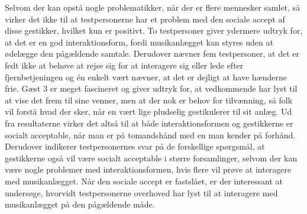 Selvom der kan opstå nogle problematikker, når der er flere mennesker samlet, så virker det ikke til at testpersonerne har et problem med den sociale accept af disse gestikker, hvilket kun er positivt. To testpersoner giver ydermere udtryk for, at det er en god interaktionsform, fordi musikanlægget kan styres uden at ødelægge den pågældende samtale. Derudover nævner fem testpersoner, at det er fedt ikke at behøve at rejse sig for at interagere sig eller lede efter fjernbetjeningen og én enkelt vært nævner, at det er dejligt at have hænderne frie. Gæst 3 er meget fascineret og giver udtryk for, at vedkommende har lyst til at vise det frem til sine venner, men at der nok er behov for tilvænning, så folk vil forstå hvad der sker, når en vært lige pludselig gestikulerer til sit anlæg. \blankline
%
Ud fra resultaterne virker det altså til at både interaktionsformen og gestikkerne er socialt acceptable, når man er på tomandshånd med en man kender på forhånd. Derudover indikerer testpersonernes svar på de forskellige spørgsmål, at gestikkerne også vil være socialt acceptable i større forsamlinger, selvom der kan være nogle problemer med interaktionsformen, hvis flere vil prøve at interagere med musikanlægget. Når den sociale accept er fastslået, er der interessant at undersøge, hvorvidt testpersonerne overhoved har lyst til at interagere med musikanlægget på den pågældende måde. 